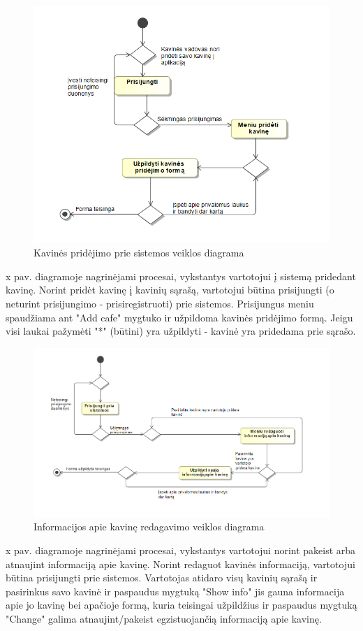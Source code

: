 \documentclass{VUMIFPSkursinis}
\begin{document}
\begin{figure}[H]
    \centering
    \includegraphics[width=\textwidth,height=\textheight,keepaspectratio]{img/addcafe} 
    \caption{Kavinės pridėjimo prie sistemos veiklos diagrama}
    \label{img:addcafe}
\end{figure}
x pav.   diagramoje nagrinėjami procesai, vykstantys vartotojui į sistemą pridedant kavinę. Norint pridėt kavinę į kavinių sąrašą, vartotojui būtina prisijungti (o neturint prisijungimo - prisiregistruoti) prie sistemos. Prisijungus meniu spaudžiama ant "Add cafe" mygtuko ir užpildoma kavinės pridėjimo formą. Jeigu visi laukai pažymėti "*" (būtini) yra užpildyti - kavinė yra pridedama prie sąrašo. 

\begin{figure}[H]
    \centering
    \includegraphics[width=\textwidth,height=\textheight,keepaspectratio]{img/editcafe} 
    \caption{Informacijos apie kavinę redagavimo veiklos diagrama}
    \label{img:editcafe}
\end{figure}
x pav.   diagramoje nagrinėjami procesai, vykstantys vartotojui norint pakeist arba atnaujint informaciją apie kavinę. Norint redaguot kavinės informaciją, vartotojui būtina prisijungti prie sistemos. Vartotojas atidaro visų kavinių sąrašą ir pasirinkus savo kavinė ir paspaudus mygtuką "Show info" jis gauna informacija apie jo kavinę bei apačioje formą, kuria teisingai užpildžius ir paspaudus mygtuką "Change" galima atnaujint/pakeist egzistuojančią informaciją apie kavinę.
\end{document}
